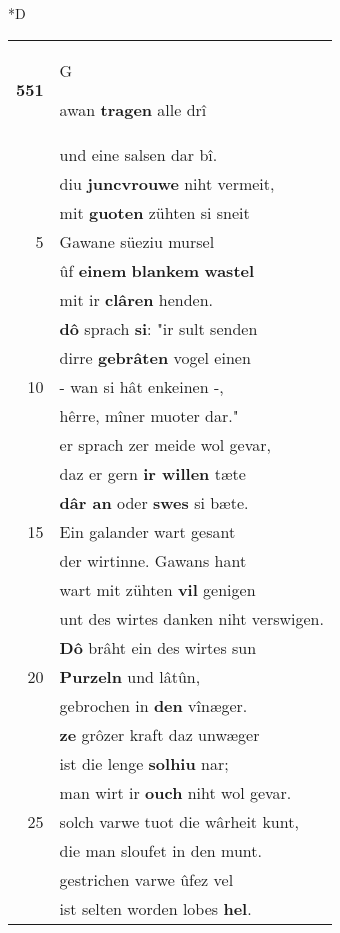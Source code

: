 \documentclass[8pt,a4paper,notitlepage]{article}
\begin{document}
\begin{table}[ht]
\begin{minipage}[t]{0.5\linewidth}
\small
\begin{center}*D
\end{center}
\begin{tabular}{rl}
\textbf{551} & \begin{large}G\end{large}awan \textbf{tragen} alle drî\\ 
 & und eine salsen dar bî.\\ 
 & diu \textbf{juncvrouwe} niht vermeit,\\ 
 & mit \textbf{guoten} zühten si sneit\\ 
5 & Gawane süeziu mursel\\ 
 & ûf \textbf{einem} \textbf{blankem} \textbf{wastel}\\ 
 & mit ir \textbf{clâren} henden.\\ 
 & \textbf{dô} sprach \textbf{si}: "ir sult senden\\ 
 & dirre \textbf{gebrâten} vogel einen\\ 
10 & - wan si hât enkeinen -,\\ 
 & hêrre, mîner muoter dar."\\ 
 & er sprach zer meide wol gevar,\\ 
 & daz er gern \textbf{ir willen} tæte\\ 
 & \textbf{dâr an} oder \textbf{swes} si bæte.\\ 
15 & Ein galander wart gesant\\ 
 & der wirtinne. Gawans hant\\ 
 & wart mit zühten \textbf{vil} genigen\\ 
 & unt des wirtes danken niht verswigen.\\ 
 & \textbf{Dô} brâht ein des wirtes sun\\ 
20 & \textbf{Purzeln} und lâtûn,\\ 
 & gebrochen in \textbf{den} vînæger.\\ 
 & \textbf{ze} grôzer kraft daz unwæger\\ 
 & ist die lenge \textbf{solhiu} nar;\\ 
 & man wirt ir \textbf{ouch} niht wol gevar.\\ 
25 & solch varwe tuot die wârheit kunt,\\ 
 & die man sloufet in den munt.\\ 
 & gestrichen varwe ûfez vel\\ 
 & ist selten worden lobes \textbf{hel}.\\ 

\end{tabular}
\end{minipage}
\end{table}
\end{document}
